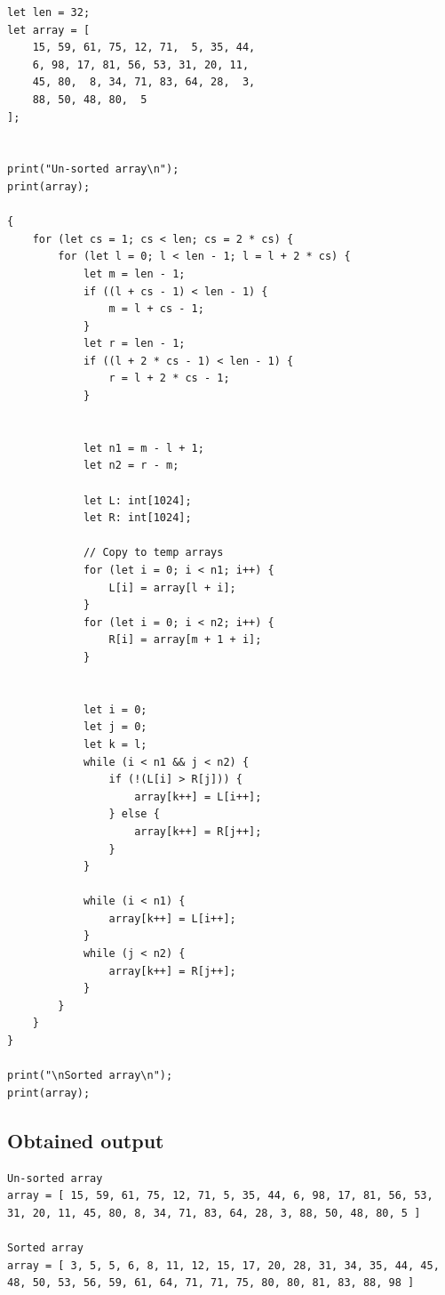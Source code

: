 \documentclass[a4paper]{article}
\begin{document}
\begin{lstlisting}[language=DPL]
let len = 32;
let array = [
    15, 59, 61, 75, 12, 71,  5, 35, 44,
    6, 98, 17, 81, 56, 53, 31, 20, 11,
    45, 80,  8, 34, 71, 83, 64, 28,  3,
    88, 50, 48, 80,  5
];


print("Un-sorted array\n");
print(array);

{
    for (let cs = 1; cs < len; cs = 2 * cs) {
        for (let l = 0; l < len - 1; l = l + 2 * cs) {
            let m = len - 1;
            if ((l + cs - 1) < len - 1) {
                m = l + cs - 1;
            }
            let r = len - 1;
            if ((l + 2 * cs - 1) < len - 1) {
                r = l + 2 * cs - 1;
            }


            let n1 = m - l + 1;
            let n2 = r - m;

            let L: int[1024];
            let R: int[1024];

            // Copy to temp arrays
            for (let i = 0; i < n1; i++) {
                L[i] = array[l + i];
            }
            for (let i = 0; i < n2; i++) {
                R[i] = array[m + 1 + i];
            }


            let i = 0;
            let j = 0;
            let k = l;
            while (i < n1 && j < n2) {
                if (!(L[i] > R[j])) {
                    array[k++] = L[i++];
                } else {
                    array[k++] = R[j++];
                }
            }

            while (i < n1) {
                array[k++] = L[i++];
            }
            while (j < n2) {
                array[k++] = R[j++];
            }
        }
    }
}

print("\nSorted array\n");
print(array);
\end{lstlisting}

\clearpage

\subsection{Obtained output}
\begin{lstlisting}
Un-sorted array
array = [ 15, 59, 61, 75, 12, 71, 5, 35, 44, 6, 98, 17, 81, 56, 53, 31, 20, 11, 45, 80, 8, 34, 71, 83, 64, 28, 3, 88, 50, 48, 80, 5 ]

Sorted array
array = [ 3, 5, 5, 6, 8, 11, 12, 15, 17, 20, 28, 31, 34, 35, 44, 45, 48, 50, 53, 56, 59, 61, 64, 71, 71, 75, 80, 80, 81, 83, 88, 98 ]
\end{lstlisting}
\end{document}
